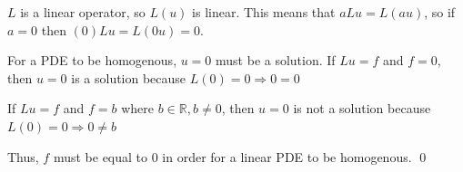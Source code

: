 \documentclass[14pt, letterpaper]{extarticle}
\begin{document}
    \newpage
    $L$ is a linear operator, so $L(u)$ is linear.
    This means that $aLu = L(au)$, so if $a=0$ then $(0)Lu = L(0u) = 0$.

    For a PDE to be homogenous, $u=0$ must be a solution.
    If $Lu = f$ and $f=0$, then $u=0$ is a solution because $L(0) = 0 \Rightarrow 0=0$

    If $Lu = f$ and $f = b$ where $b \in \mathbb{R}, b \neq 0$, then $u=0$ is not a solution because $L(0) = 0 \Rightarrow 0 \neq b$

    Thus, $f$ must be equal to $0$ in order for a linear PDE to be homogenous. \qed
\end{document}
